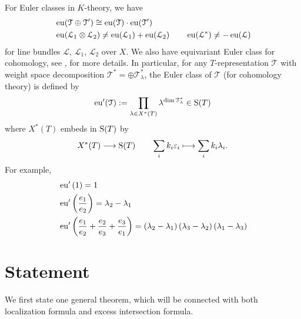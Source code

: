 \begin{remark}
For Euler classes in $K$-theory, we have
\begin{equation*}
\begin{aligned}
  &  \operatorname{\operatorname{eu}}(\mathcal{T} \oplus \mathcal{T}') \cong \operatorname{\operatorname{eu}}(\mathcal{T}) \cdot \operatorname{\operatorname{eu}}(\mathcal{T}')            \\ 
  & \operatorname{\operatorname{eu}}(\mathcal{L}_1 \otimes \mathcal{L}_2) \neq \operatorname{\operatorname{eu}}(\mathcal{L}_1 )+\operatorname{\operatorname{eu}}( \mathcal{L}_2) \qquad \operatorname{\operatorname{eu}}(\mathcal{L}^{*}) \neq -\operatorname{\operatorname{eu}}(\mathcal{L})
\end{aligned}
\end{equation*}
for line bundles $\mathcal{L}$, $\mathcal{L}_1$, $\mathcal{L}_2$ over $X$. We also have equivariant Euler class for cohomology, see \cite[Chapter 9]{przezdziecki2015geometric}, \cite[Section 22]{dugger2014geometric} for more details. In particular, for any $T$-representation $\mathcal{T}$ with weight space decomposition $\mathcal{T}^{*} = \oplus \mathcal{T}_{\lambda}^{*}$, the Euler class of $\mathcal{T}$ (for cohomology theory) is defined by
$$\operatorname{\operatorname{eu}}'(\mathcal{T}):= \prod_{\lambda \in X^{*}(T)} \lambda^{\dim \mathcal{T}_{\lambda}^{*}} \in \operatorname{\operatorname{S}}(T) $$
where $X^{*}(T)$ embeds in $\operatorname{\operatorname{S}}(T)$ by
$$X^{*}(T) \longrightarrow \operatorname{\operatorname{S}}(T) \qquad \sum_{i}k_i \varepsilon_i \longmapsto \sum_{i}k_i \lambda_i.$$
For example,
\begin{equation*}
\begin{aligned}
  &\operatorname{\operatorname{eu}}'\left( 1 \right)=  1\\ 
    &\operatorname{\operatorname{eu}}'\left( \frac{e_1}{e_2} \right)=  \lambda_2-\lambda_1\\ 
      &\operatorname{\operatorname{eu}}'\left(\frac{e_1}{e_2}+\frac{e_2}{e_3}+\frac{e_3}{e_1} \right)=  \left(\lambda_2-\lambda_1\right)\left(\lambda_3-\lambda_2\right)\left(\lambda_1-\lambda_3\right)\\ 
\end{aligned}
\end{equation*}
\end{remark}

\section{Statement}\label{sec:statement_localization}
We first state one general theorem, which will be connected with both localization formula and excess intersection formula.


